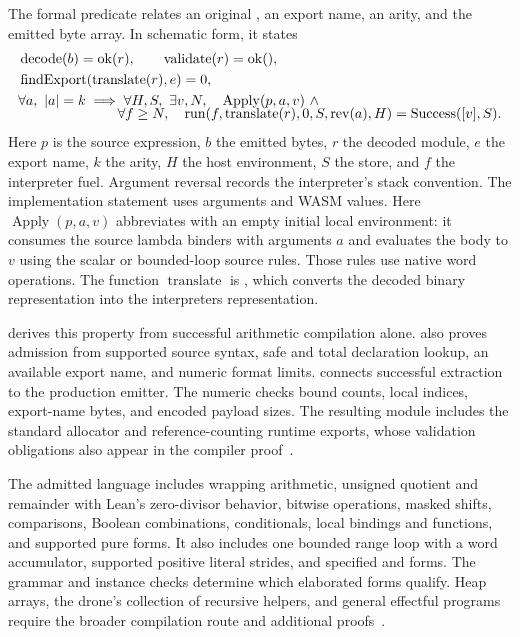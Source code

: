 \documentclass[11pt]{article}
\begin{document}
The formal predicate  relates an original , an export name, an arity, and the emitted byte array.  In schematic form, it states
\begin{align*}
 &\operatorname{decode}(b)=\operatorname{ok}(r),\qquad
   \operatorname{validate}(r)=\operatorname{ok}(),\\
 &\operatorname{findExport}(\operatorname{translate}(r),e)=0,\\
 &\forall a,\ |a|=k\;\Longrightarrow\;\forall H,S,\ \exists v,N,\quad
   \operatorname{Apply}(p,a,v)\ \land\\[-2mm]
 &\hspace{25mm}\forall f\geq N,\quad
   \operatorname{run}(f,\operatorname{translate}(r),0,S,\operatorname{rev}(a),H)
   =\operatorname{Success}([v],S).
\end{align*}
Here $p$ is the source expression, $b$ the emitted bytes, $r$ the decoded module, $e$ the export name, $k$ the arity, $H$ the host environment, $S$ the store, and $f$ the interpreter fuel.  Argument reversal records the interpreter's stack convention.  The implementation statement uses  arguments and WASM  values.  Here $\operatorname{Apply}(p,a,v)$ abbreviates  with an empty initial local environment: it consumes the source lambda binders with arguments $a$ and evaluates the body to $v$ using the scalar or bounded-loop source rules.  Those rules use native word operations.  The function $\operatorname{translate}$ is , which converts the decoded binary representation into the interpreter\textquotesingle s  representation.

 derives this property from successful arithmetic compilation alone.   also proves admission from supported source syntax, safe and total declaration lookup, an available export name, and numeric format limits.   connects successful extraction to the production  emitter.  The numeric checks bound counts, local indices, export-name bytes, and encoded payload sizes.  The resulting module includes the standard allocator and reference-counting runtime exports, whose validation obligations also appear in the compiler proof~\cite{compiler-source,compiler-correctness}.

The admitted language includes wrapping  arithmetic, unsigned quotient and remainder with Lean's zero-divisor behavior, bitwise operations, masked shifts, comparisons, Boolean combinations, conditionals, local bindings and functions, and supported pure  forms.  It also includes one bounded range loop with a word accumulator, supported positive literal strides, and specified  and  forms.  The grammar and instance checks determine which elaborated forms qualify.  Heap arrays, the drone's collection of recursive helpers, and general effectful programs require the broader compilation route and additional proofs~\cite{compiler-correctness}.
\end{document}
